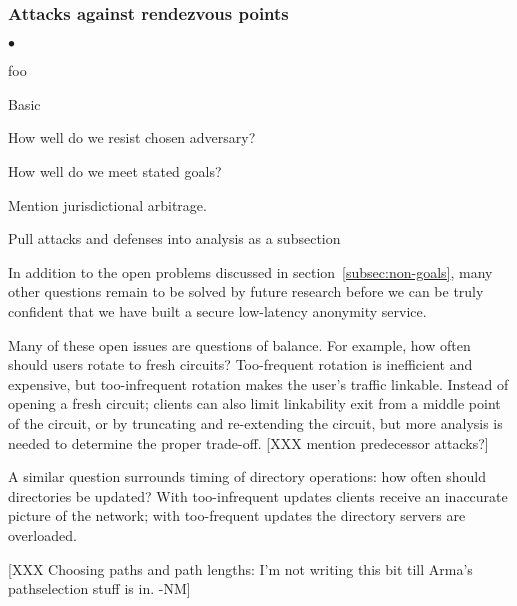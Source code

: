 \documentclass[times,10pt,twocolumn]{article}
\newenvironment{tightlist}{\begin{list}{$\bullet$}{
  \setlength{\itemsep}{0mm}
    \setlength{\parsep}{0mm}
    }}{\end{list}}
\begin{document}
\subsubsection*{Attacks against rendezvous points}
\begin{tightlist}
\item foo
\end{tightlist}



Basic 

How well do we resist chosen adversary?

How well do we meet stated goals?

Mention jurisdictional arbitrage.

Pull attacks and defenses into analysis as a subsection

\label{sec:maintaining-anonymity}
 



In addition to the open problems discussed in
section~\ref{subsec:non-goals}, many other questions remain to be
solved by future research before we can be truly confident that we
have built a secure low-latency anonymity service.

Many of these open issues are questions of balance.  For example,
how often should users rotate to fresh circuits?  Too-frequent
rotation is inefficient and expensive, but too-infrequent rotation
makes the user's traffic linkable.   Instead of opening a fresh
circuit; clients can also limit linkability exit from a middle point
of the circuit, or by truncating and re-extending the circuit, but
more analysis is needed to determine the proper trade-off.
[XXX mention predecessor attacks?]

A similar question surrounds timing of directory operations:
how often should directories be updated?  With too-infrequent
updates clients receive an inaccurate picture of the network; with
too-frequent updates the directory servers are overloaded.

%

[XXX Choosing paths and path lengths: I'm not writing this bit till
  Arma's pathselection stuff is in. -NM]
\end{document}
